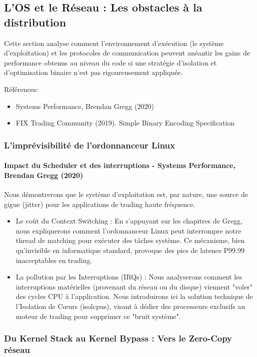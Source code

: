 \subsection{L’OS et le Réseau : Les obstacles à la distribution}

Cette section analyse comment l'environnement d'exécution (le système d'exploitation) et les protocoles de communication peuvent anéantir les gains de performance obtenus au niveau du code si une stratégie d'isolation et d'optimisation binaire n'est pas rigoureusement appliquée.

Références:
\begin{itemize}
    \item Systems Performance, Brendan Gregg (2020)
    \item  FIX Trading Community (2019). Simple Binary Encoding Specification
\end{itemize}

\subsubsection{L’imprévisibilité de l’ordonnanceur Linux}

\paragraph{Impact du Scheduler et des interruptions - Systems Performance, Brendan Gregg (2020)}
Nous démontrerons que le système d'exploitation est, par nature, une source de gigue (jitter) pour les applications de trading haute fréquence.

\begin{itemize}
    \item Le coût du Context Switching : En s'appuyant sur les chapitres de Gregg, nous expliquerons comment l'ordonnanceur Linux peut interrompre notre thread de matching pour exécuter des tâches système. Ce mécanisme, bien qu'invisible en informatique standard, provoque des pics de latence P99.99 inacceptables en trading.
    \item La pollution par les Interruptions (IRQs) : Nous analyserons comment les interruptions matérielles (provenant du réseau ou du disque) viennent "voler" des cycles CPU à l'application. Nous introduirons ici la solution technique de l'Isolation de Cœurs (isolcpus), visant à dédier des processeurs exclusifs au moteur de trading pour supprimer ce "bruit système".
\end{itemize}

\subsubsection{Du Kernel Stack au Kernel Bypass : Vers le Zero-Copy réseau}


